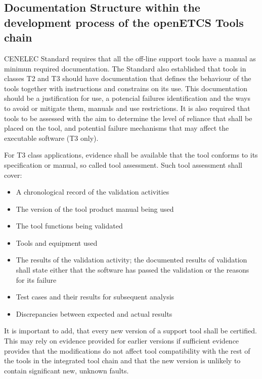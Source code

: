 \documentclass{template/openetcs_article}
\begin{document}
\subsection{Documentation Structure within the development process of the openETCS Tools chain}

CENELEC Standard requires that all the off-line support tools have a manual as  minimun required documentation. The Standard also established that tools in classes T2 and T3 should have documentation that defines the behaviour of the tools together with instructions and constrains on its use. This documentation should be a justification for use, a potencial failures identification and the ways to avoid or mitigate them, manuals and use restrictions. It is also required that tools to be assessed with the aim to determine the level of reliance that shall be placed on the tool, and potential failure mechanisms that may affect the executable software (T3 only).

For T3 class applications, evidence shall be available that the tool conforms to its specification or manual, so called tool assessment. Such tool assessment shall cover:
\begin{itemize}
\item A chronological record of the validation activities
\item The version of the tool product manual being used
\item The tool functions being validated
\item Tools and equipment used
\item The results of the validation activity; the documented results of validation shall state either that the software has passed the validation or the reasons for its failure
\item Test cases and their results for subsequent analysis
\item Discrepancies between expected and actual results
\end{itemize}

It is important to add, that every new version of a support tool shall be certified. This may rely on evidence provided for earlier versions if sufficient evidence provides that the modifications do not affect tool compatibility with the rest of the tools in the integrated tool chain and that the new version is unlikely to contain significant new, unknown faults.
\end{document}
